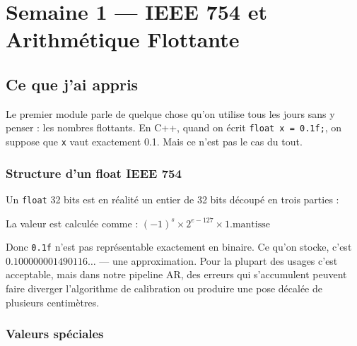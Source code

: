 \documentclass[12pt,a4paper]{report}
\newcommand{\code}[1]{\texttt{\textcolor{myblue}{#1}}}
\begin{document}
\chapter{Semaine 1 — IEEE 754 et Arithmétique Flottante}

\section{Ce que j'ai appris}

Le premier module parle de quelque chose qu'on utilise tous les jours sans y penser : les nombres flottants. En C++, quand on écrit \code{float x = 0.1f;}, on suppose que \code{x} vaut exactement 0.1. Mais ce n'est pas le cas du tout.

\subsection{Structure d'un float IEEE 754}

Un \code{float} 32 bits est en réalité un entier de 32 bits découpé en trois parties :

\begin{center}
\end{center}

La valeur est calculée comme : $(-1)^{s} \times 2^{e-127} \times 1.\text{mantisse}$

\medskip

Donc \code{0.1f} n'est pas représentable exactement en binaire. Ce qu'on stocke, c'est
$0.100000001490116\ldots$ — une approximation. Pour la plupart des usages c'est
acceptable, mais dans notre pipeline AR, des erreurs qui s'accumulent peuvent faire
diverger l'algorithme de calibration ou produire une pose décalée de plusieurs
centimètres.

\subsection{Valeurs spéciales}
\end{document}
